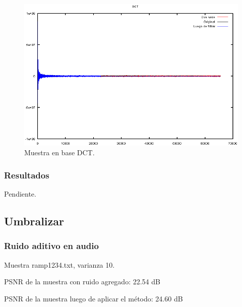 \documentclass[a4paper,10pt,twoside]{article}
\begin{document}
\begin{figure}[H]
  \centering
  \includegraphics[width=15cm]{graficos/lena_impulsivo_atenuar_dct.png} 
  \caption{Muestra en base DCT.}
\end{figure}

\subsubsection{Resultados}

Pendiente.




\subsection{Umbralizar}


\subsubsection{Ruido aditivo en audio}

Muestra ramp1234.txt, varianza 10.

PSNR de la muestra con ruido agregado: 22.54 dB

PSNR de la muestra luego de aplicar el método: 24.60 dB
\end{document}

